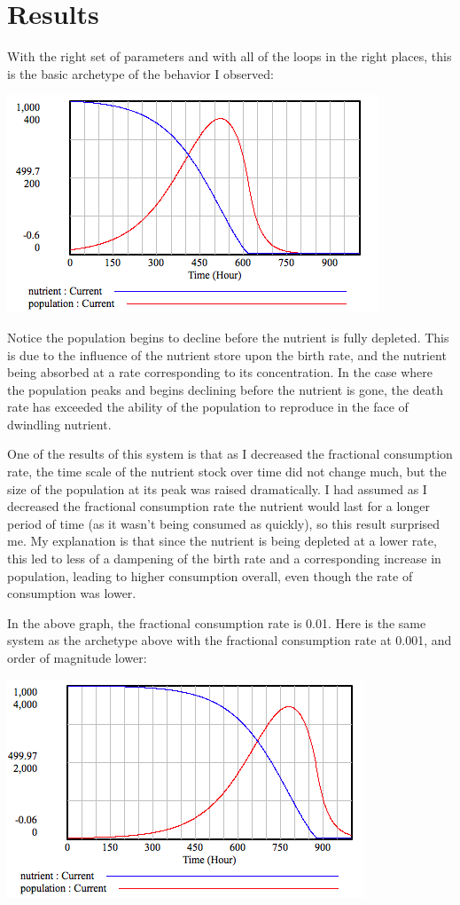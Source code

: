 \documentclass[12pt]{article}
\begin{document}
\section{Results}

With the right set of parameters and with all of the loops in the right places, this is the basic archetype of the behavior I observed:

\includegraphics[scale=0.72]{archetype.png}

Notice the population begins to decline before the nutrient is fully depleted.  This is due to the influence of the nutrient store upon the birth rate, and the nutrient being absorbed at a rate corresponding to its concentration.  In the case where the population peaks and begins declining before the nutrient is gone, the death rate has exceeded the ability of the population to reproduce in the face of dwindling nutrient.  

One of the results of this system is that as I decreased the fractional consumption rate, the time scale of the nutrient stock over time did not change much, but the size of the population at its peak was raised dramatically.  I had assumed as I decreased the fractional consumption rate the nutrient would last for a longer period of time (as it wasn't being consumed as quickly), so this result surprised me.  My explanation is that since the nutrient is being depleted at a lower rate, this led to less of a dampening of the birth rate and a corresponding increase in population, leading to higher consumption overall, even though the rate of consumption was lower.  

In the above graph, the fractional consumption rate is 0.01.  Here is the same system as the archetype above with the fractional consumption rate at 0.001, and order of magnitude lower:

\includegraphics[scale=0.72]{lowconsumptionrate.png}
\end{document}
